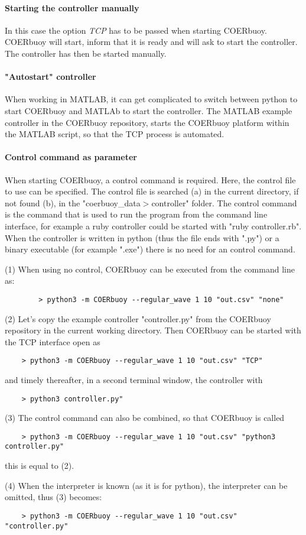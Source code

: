 \documentclass[oneside,10pt,a4paper]{book}
\begin{document}
\paragraph{Starting the controller manually}
In this case the option \textit{TCP} has to be passed when starting COERbuoy. COERbuoy will start, inform that it is ready and will ask to start the controller. The controller has then be started manually.
\paragraph{"Autostart" controller}
When working in MATLAB, it can get complicated to switch between python to start COERbuoy and MATLAb to start the controller. The MATLAB example controller in the COERbuoy repository, starts the COERbuoy platform within the MATLAB script, so that the TCP process is automated.
\paragraph{Control command as parameter}
When starting COERbuoy, a control command is required. Here, the control file to use can be specified. The control file is searched (a) in the current directory, if not found (b), in the "coerbuoy\_data$>$controller" folder. The control command is the command that is used to run the program from the command line interface, for example a ruby controller could be started with "ruby controller.rb". When the controller is written in python (thus the file ends with ".py") or a binary executable (for example ".exe") there is no need for an control command.
\begin{example}
	
	(1) When using no control, COERbuoy can be executed from the command line as:
	\begin{verbatim}
		> python3 -m COERbuoy --regular_wave 1 10 "out.csv" "none"
	\end{verbatim}
(2) Let's copy the example controller "controller.py" from the COERbuoy repository in the current working directory. Then COERbuoy can be started with the TCP interface open as
\begin{verbatim}
	> python3 -m COERbuoy --regular_wave 1 10 "out.csv" "TCP"
\end{verbatim}
and timely thereafter, in a second terminal window, the controller with
\begin{verbatim}
	> python3 controller.py"
\end{verbatim}

(3) The control command can also be combined, so that COERbuoy is called 
\begin{verbatim}
	> python3 -m COERbuoy --regular_wave 1 10 "out.csv" "python3 controller.py"
\end{verbatim}
this is equal to (2).

(4) When the interpreter is known (as it is for python), the interpreter can be omitted, thus (3) becomes:
\begin{verbatim}
	> python3 -m COERbuoy --regular_wave 1 10 "out.csv" "controller.py"
\end{verbatim}
\end{example}
\end{document}

